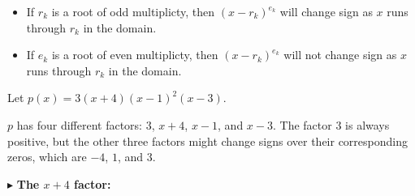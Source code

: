 \documentclass{ximera}
\begin{document}
\begin{itemize}
\item If $r_k$ is a root of odd multiplicty, then $(x-r_k)^{e_k}$ will change sign as $x$ runs through $r_k$ in the domain.
\item If $e_k$ is a root of even multiplicty, then $(x-r_k)^{e_k}$ will not change sign as $x$ runs through $r_k$ in the domain.
\end{itemize}






\begin{example}


Let $p(x) = 3(x+4) (x-1)^2 (x-3)$.

$p$ has four different factors: $3$, $x+4$, $x-1$, and $x-3$.  The factor $3$ is always positive, but the other three factors might change signs over their corresponding zeros, which are $-4$, $1$, and $3$.


$\blacktriangleright$ \textbf{The $x+4$ factor:}

\begin{image}
  \end{image}








\end{example}
\end{document}
